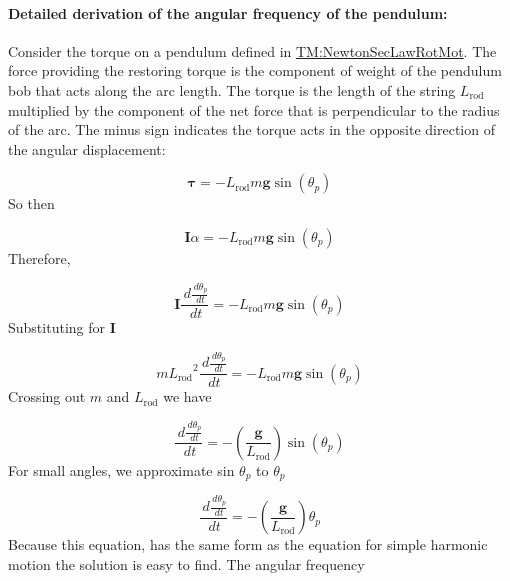 \documentclass[12pt]{article}
\begin{document}
\paragraph{Detailed derivation of the angular frequency of the pendulum:}
\label{GD:angFrequencyGDDeriv}
Consider the torque on a pendulum defined in \hyperref[TM:NewtonSecLawRotMot]{TM:NewtonSecLawRotMot}. The force providing the restoring torque is the component of weight of the pendulum bob that acts along the arc length. The torque is the length of the string ${L_{\text{rod}}}$ multiplied by the component of the net force that is perpendicular to the radius of the arc. The minus sign indicates the torque acts in the opposite direction of the angular displacement:

\begin{displaymath}
\symbf{τ}=-{L_{\text{rod}}} m \symbf{g} \sin\left({θ_{p}}\right)
\end{displaymath}
So then

\begin{displaymath}
\symbf{I} α=-{L_{\text{rod}}} m \symbf{g} \sin\left({θ_{p}}\right)
\end{displaymath}
Therefore,

\begin{displaymath}
\symbf{I} \frac{\,d\frac{\,d{θ_{p}}}{\,dt}}{\,dt}=-{L_{\text{rod}}} m \symbf{g} \sin\left({θ_{p}}\right)
\end{displaymath}
Substituting for $\symbf{I}$

\begin{displaymath}
m {L_{\text{rod}}}^{2} \frac{\,d\frac{\,d{θ_{p}}}{\,dt}}{\,dt}=-{L_{\text{rod}}} m \symbf{g} \sin\left({θ_{p}}\right)
\end{displaymath}
Crossing out $m$ and ${L_{\text{rod}}}$ we have

\begin{displaymath}
\frac{\,d\frac{\,d{θ_{p}}}{\,dt}}{\,dt}=-\left(\frac{\symbf{g}}{{L_{\text{rod}}}}\right) \sin\left({θ_{p}}\right)
\end{displaymath}
For small angles, we approximate sin ${θ_{p}}$ to ${θ_{p}}$

\begin{displaymath}
\frac{\,d\frac{\,d{θ_{p}}}{\,dt}}{\,dt}=-\left(\frac{\symbf{g}}{{L_{\text{rod}}}}\right) {θ_{p}}
\end{displaymath}
Because this equation, has the same form as the equation for simple harmonic motion the solution is easy to find.  The angular frequency
\end{document}
